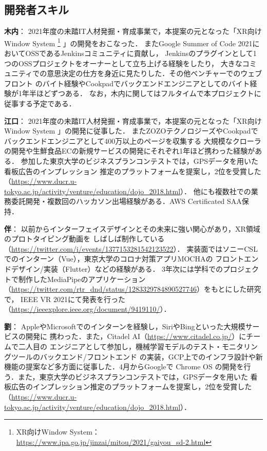 \subsection{開発者スキル}

\textbf{木内}：
2021年度の未踏IT人材発掘・育成事業で，本提案の元となった「XR向けWindow System
\footnote{XR向けWindow System： \url{https://www.ipa.go.jp/jinzai/mitou/2021/gaiyou_sd-2.html}}
」の開発をおこなった．
またGoogle Summer of Code 2021においてOSSであるJenkinsコミュニティに貢献し，
Jenkinsのプラグインとして1つのOSSプロジェクトをオーナーとして立ち上げる経験をしたり，
大きなコミュニティでの意思決定の仕方を身近に見たりした．その他ベンチャーでのウェブフロント
のバイト経験やCookpadでバックエンドエンジニアとしてのバイト経験が1年半ほどずつある．
なお，木内に関してはフルタイムで本プロジェクトに従事する予定である．

\textbf{江口}：
2021年度の未踏IT人材発掘・育成事業で，本提案の元となった「XR向けWindow System
\footnotemark[18]
」の開発に従事した．
またZOZOテクノロジーズやCookpadでバックエンドエンジニアとして400万以上のページを収集する
大規模なクローラの開発や生鮮食品ECの新規サービスの開発にそれぞれ1年ほど携わった経験がある．
参加した東京大学のビジネスプランコンテストでは，GPSデータを用いた看板広告のインプレッション
推定のプラットフォームを提案し，2位を受賞した
（\url{https://www.ducr.u-tokyo.ac.jp/activity/venture/education/dojo_2018.html}）．
他にも複数社での業務委託開発・複数回のハッカソン出場経験がある．AWS Certificated SAA保持．

\textbf{伴}：
以前からインターフェイスデザインとその未来に強い関心があり，XR領域のプロトタイピング動画を
しばしば制作している（\url{https://twitter.com/i/events/1377153281542123522}）．
実装面ではソニーCSLでのインターン（Vue），東京大学のコロナ対策アプリMOCHAの
フロントエンドデザイン/実装（Flutter）などの経験がある．
3年次には学科でのプロジェクトで制作したMediaPipeのアプリケーション
（\url{https://twitter.com/rtr_dnd/status/1283329784890527746}）をもとにした研究で，
IEEE VR 2021にて発表を行った（\url{https://ieeexplore.ieee.org/document/9419110/}）．

\textbf{劉}：
AppleやMicrosoftでのインターンを経験し，SiriやBingといった大規模サービスの開発に
携わった．また，Citadel AI（\url{https://www.citadel.co.jp/}）にチームで二人目の
エンジニアとして参加し，機械学習モデルのテスト・モニタリングツールのバックエンド/フロントエンド
の実装，GCP上でのインフラ設計や新機能の提案など多方面に従事した．4月からGoogleで
Chrome OS の開発を行う．また，東京大学のビジネスプランコンテストでは，GPSデータを用いた
看板広告のインプレッション推定のプラットフォームを提案し，2位を受賞した
（\url{https://www.ducr.u-tokyo.ac.jp/activity/venture/education/dojo_2018.html}）．

